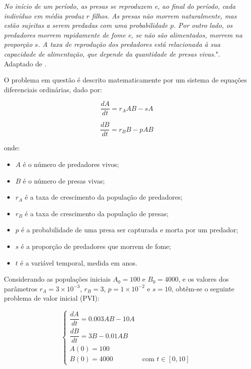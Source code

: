 \emph{
	No início de um período, as presas se reproduzem e, ao final do período, cada indivíduo em média produz $r$ filhos. As presas não morrem naturalmente, mas estão sujeitas a serem predadas com uma probabilidade $p$. Por outro lado, os predadores morrem rapidamente de fome e, se não são alimentados, morrem na proporção $s$. A taxa de reprodução dos predadores está relacionada à sua capacidade de alimentação, que depende da quantidade de presas vivas.}". Adaptado de \cite{burkardt2009}.

O problema em questão é descrito matematicamente por um sistema de equações diferenciais ordinárias, dado por:

\begin{equation*}\label{predator_formula}
	\dfrac{dA}{dt} = r_AAB - sA
\end{equation*}

\begin{equation*}\label{prey_formula}
	\dfrac{dB}{dt} = r_BB - pAB
\end{equation*}

onde:

\begin{itemize}
\item $A$ é o número de predadores vivos;
\item $B$ é o número de presas vivas;
\item $r_A$ é a taxa de crescimento da população de predadores;
\item $r_B$ é a taxa de crescimento da população de presas;
\item $p$ é a probabilidade de uma presa ser capturada e morta por um predador;
\item $s$ é a proporção de predadores que morrem de fome;
\item $t$ é a variável temporal, medida em anos.
\end{itemize}

Considerando as populações iniciais $A_0 = 100$ e $B_0 = 4000$, e os valores dos parâmetros $r_A = 3 \times 10^{-3}$, $r_B = 3$, $p = 1 \times 10^{-2}$ e $s = 10$, obtêm-se o seguinte problema de valor inicial (PVI):

\begin{equation}\label{pvi-predator-prey}
	\begin{cases}
		\dfrac{dA}{dt} = 0.003AB - 10A &                            \\[3mm]
        \dfrac{dB}{dt} = 3B - 0.01AB   &                            \\[2mm]
		A(0) = 100                    &                            \\
        B(0) = 4000                   & \text{ com } t \in [0, 10] 
	\end{cases}
\end{equation}

